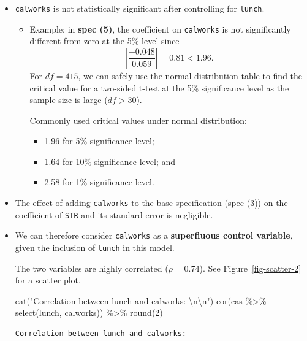 \documentclass[
  12pt,
  a4paper,
]{scrbook}
\newenvironment{Shaded}{\begin{snugshade}}{\end{snugshade}}
\newcommand{\DecValTok}[1]{\textcolor[rgb]{0.68,0.00,0.00}{#1}}
\newcommand{\FunctionTok}[1]{\textcolor[rgb]{0.28,0.35,0.67}{#1}}
\newcommand{\NormalTok}[1]{\textcolor[rgb]{0.00,0.23,0.31}{#1}}
\newcommand{\SpecialCharTok}[1]{\textcolor[rgb]{0.37,0.37,0.37}{#1}}
\newcommand{\StringTok}[1]{\textcolor[rgb]{0.13,0.47,0.30}{#1}}
\providecommand{\tightlist}{%
  \setlength{\itemsep}{0pt}\setlength{\parskip}{0pt}}
\renewcommand{\tightlist}{\setlength{\itemsep}{0.5\baselineskip}\setlength{\parskip}{0.2\baselineskip}}
\theoremstyle{plain}
\theoremstyle{definition}
\theoremstyle{remark}
\begin{document}
\begin{itemize}
\item
  \texttt{calworks} is not statistically significant after controlling
  for \texttt{lunch}.

  \begin{itemize}
  \item
    Example: in \textbf{spec (5)}, the coefficient on \texttt{calworks}
    is not significantly different from zero at the 5\% level since \[
    \left|\frac{-0.048}{0.059}\right| = 0.81 < 1.96.
    \] For \(df = 415\), we can safely use the normal distribution table
    to find the critical value for a two-sided t-test at the 5\%
    significance level as the sample size is large (\(df>30\)).

    Commonly used critical values under normal distribution:

    \begin{itemize}
    \tightlist
    \item
      {1.96 for 5\% significance level;}
    \item
      1.64 for 10\% significance level; and
    \item
      2.58 for 1\% significance level.
    \end{itemize}
  \end{itemize}
\item
  The effect of adding \texttt{calworks} to the base specification (spec
  (3)) on the coefficient of \texttt{STR} and its standard error is
  negligible.
\item
  We can therefore consider \texttt{calworks} as a \textbf{superfluous
  control variable}, given the inclusion of \texttt{lunch} in this
  model.

  The two variables are highly correlated (\(\rho = 0.74\)). See
  Figure~\ref{fig-scatter-2} for a scatter plot.

\begin{Shaded}
\begin{Highlighting}[]
\FunctionTok{cat}\NormalTok{(}\StringTok{"Correlation between lunch and calworks: }\SpecialCharTok{\textbackslash{}n\textbackslash{}n}\StringTok{"}\NormalTok{)}
\FunctionTok{cor}\NormalTok{(cas }\SpecialCharTok{\%\textgreater{}\%} \FunctionTok{select}\NormalTok{(lunch, calworks)) }\SpecialCharTok{\%\textgreater{}\%} \FunctionTok{round}\NormalTok{(}\DecValTok{2}\NormalTok{)}
\end{Highlighting}
\end{Shaded}

\begin{verbatim}
Correlation between lunch and calworks: 


\end{verbatim}
\end{itemize}
\end{document}
